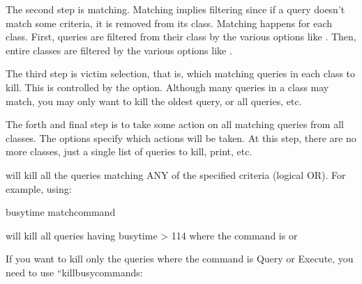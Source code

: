 \documentclass[letterpaper,10pt,english]{sphinxmanual}
\begin{document}
The second step is matching.  Matching implies filtering since if a query
doesn’t match some criteria, it is removed from its class.
Matching happens for each class.  First, queries are filtered from their
class by the various  options like {\hyperref[\detokenize{mariadb-kill:cmdoption-mariadb-kill-match-user}]{}}.
Then, entire classes are filtered by the various  options
like {\hyperref[\detokenize{mariadb-kill:cmdoption-mariadb-kill-query-count}]{}}.

The third step is victim selection, that is, which matching queries in each
class to kill.  This is controlled by the {\hyperref[\detokenize{mariadb-kill:cmdoption-mariadb-kill-victims}]{}} option.  Although
many queries in a class may match, you may only want to kill the oldest
query, or all queries, etc.

The forth and final step is to take some action on all matching queries
from all classes.  The  options specify which actions will be
taken.  At this step, there are no more classes, just a single list of
queries to kill, print, etc.

 will kill all the queries matching ANY of the specified criteria (logical OR).
For example, using:

\begin{sphinxVerbatim}[commandchars=\\\{\}]
\PYGZhy{}\PYGZhy{}busy\PYGZhy{}time  \PYGZhy{}\PYGZhy{}match\PYGZhy{}command 
\end{sphinxVerbatim}

will kill all queries having busy\sphinxhyphen{}time \textgreater{} 114  where the command is  or 

If you want to kill only the queries where  the command is Query or
Execute, you need to use “\textendash{}kill\sphinxhyphen{}busy\sphinxhyphen{}commands:
\end{document}
